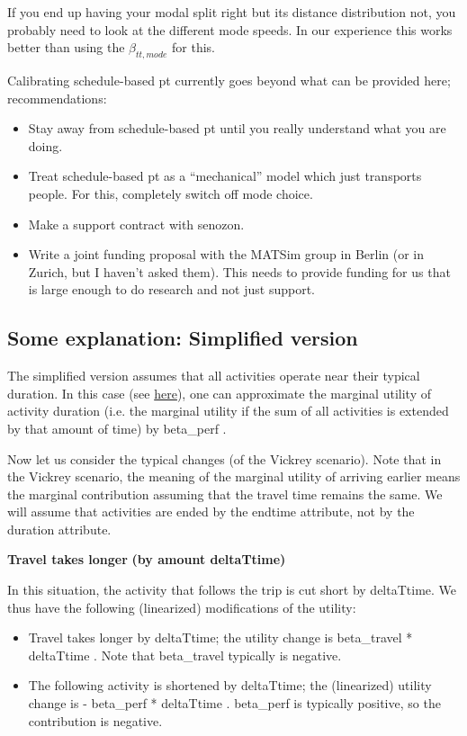 \documentclass[a4paper,11pt]{report}
\begin{document}
If you end up having your modal split right but its distance distribution not, you probably need to look at the different mode speeds.  In our experience this works better than using the $\beta_{tt,mode}$ for this.

Calibrating schedule-based pt currently goes beyond what can be provided here; recommendations:
\begin{itemize}

\item Stay away from schedule-based pt until you really understand what you are doing.

\item Treat schedule-based pt as a ``mechanical'' model which just transports people.  For this, completely switch off mode choice.

\item Make a support contract with senozon.

\item Write a joint funding proposal with the MATSim group in Berlin (or in Zurich, but I haven't asked them).  This needs to provide funding for us that is large enough to do research and not just support.

\end{itemize}

\subsection{Some explanation: Simplified version}

The simplified version assumes that all activities operate near their typical duration. In this case (see \href{http://matsim.org/node/651}{here}),  one can approximate the marginal utility of activity duration (i.e. the  marginal utility if the sum of all activities is extended by that  amount of time) by beta\_perf .

Now let us consider the typical changes (of the Vickrey  scenario). Note that in the Vickrey scenario, the meaning of the  marginal utility of arriving earlier means the marginal contribution  assuming that the travel time remains the same. We will assume  that activities are ended by the endtime attribute, not by the duration  attribute.

\textbf{Travel takes longer}\textbf{ (by amount deltaTtime)}

In this situation, the activity that follows the trip is cut short by  deltaTtime. We thus have the following (linearized) modifications  of the utility:
\begin{itemize}
	\item Travel takes longer by deltaTtime; the utility change is  beta\_travel * deltaTtime . Note that beta\_travel typically is  negative.
	\item The following activity is shortened by deltaTtime; the (linearized)  utility change is - beta\_perf * deltaTtime . beta\_perf is  typically positive, so the contribution is negative.
\end{itemize}
\end{document}
